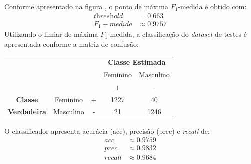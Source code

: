 \documentclass{article}
\begin{document}
    Conforme apresentado na figura , o ponto de máxima $F_1$-medida é
    obtido com:
    \begin{align*}
        \textit{threshold}&=0.663 \\
        F_1-medida&\approx0.9757
    \end{align*}
    Utilizando o limiar de máxima $F_1$-medida, a classificação do \textit{dataset} de testes é 
    apresentada conforme a matriz de confusão:
    \begin{table}[H]
        \begin{tabular}{ccccc}
        &  &  & \multicolumn{2}{c}{\textbf{Classe Estimada}} \\
        &  &  & Feminino & Masculino\\
        &  &  & + & - \\ \cline{4-5} 
        \textbf{Classe} & Feminino & \multicolumn{1}{c|}{+} & \multicolumn{1}{c|}{1227} & \multicolumn{1}{c|}{40} \\ \cline{4-5} 
        \textbf{Verdadeira} & Masculino & \multicolumn{1}{c|}{-} & \multicolumn{1}{c|}{21} & \multicolumn{1}{c|}{1246} \\ \cline{4-5} 
        \end{tabular}
    \end{table}
    O classificador apresenta acurácia (acc), precisão (prec) e \textit{recall} de:
    \begin{align*}
        acc & \approx0.9759 \\
        prec & \approx0.9832 \\
        recall & \approx0.9684
    \end{align*}
\end{document}
